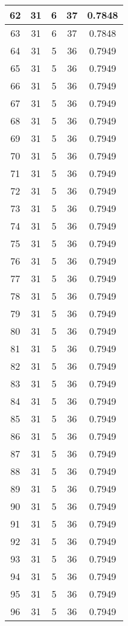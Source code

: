 \documentclass[letterpaper, 12pt]{article}
\begin{document}
\begin{longtable}{|c|c|c|c|c|}
\hline
62 & 31 & 6 & 37 & 0.7848 \\
\hline
63 & 31 & 6 & 37 & 0.7848 \\
\hline
64 & 31 & 5 & 36 & 0.7949 \\
\hline
65 & 31 & 5 & 36 & 0.7949 \\
\hline
66 & 31 & 5 & 36 & 0.7949 \\
\hline
67 & 31 & 5 & 36 & 0.7949 \\
\hline
68 & 31 & 5 & 36 & 0.7949 \\
\hline
69 & 31 & 5 & 36 & 0.7949 \\
\hline
70 & 31 & 5 & 36 & 0.7949 \\
\hline
71 & 31 & 5 & 36 & 0.7949 \\
\hline
72 & 31 & 5 & 36 & 0.7949 \\
\hline
73 & 31 & 5 & 36 & 0.7949 \\
\hline
74 & 31 & 5 & 36 & 0.7949 \\
\hline
75 & 31 & 5 & 36 & 0.7949 \\
\hline
76 & 31 & 5 & 36 & 0.7949 \\
\hline
77 & 31 & 5 & 36 & 0.7949 \\
\hline
78 & 31 & 5 & 36 & 0.7949 \\
\hline
79 & 31 & 5 & 36 & 0.7949 \\
\hline
80 & 31 & 5 & 36 & 0.7949 \\
\hline
81 & 31 & 5 & 36 & 0.7949 \\
\hline
82 & 31 & 5 & 36 & 0.7949 \\
\hline
83 & 31 & 5 & 36 & 0.7949 \\
\hline
84 & 31 & 5 & 36 & 0.7949 \\
\hline
85 & 31 & 5 & 36 & 0.7949 \\
\hline
86 & 31 & 5 & 36 & 0.7949 \\
\hline
87 & 31 & 5 & 36 & 0.7949 \\
\hline
88 & 31 & 5 & 36 & 0.7949 \\
\hline
89 & 31 & 5 & 36 & 0.7949 \\
\hline
90 & 31 & 5 & 36 & 0.7949 \\
\hline
91 & 31 & 5 & 36 & 0.7949 \\
\hline
92 & 31 & 5 & 36 & 0.7949 \\
\hline
93 & 31 & 5 & 36 & 0.7949 \\
\hline
94 & 31 & 5 & 36 & 0.7949 \\
\hline
95 & 31 & 5 & 36 & 0.7949 \\
\hline
96 & 31 & 5 & 36 & 0.7949 \\

\end{longtable}
\end{document}
